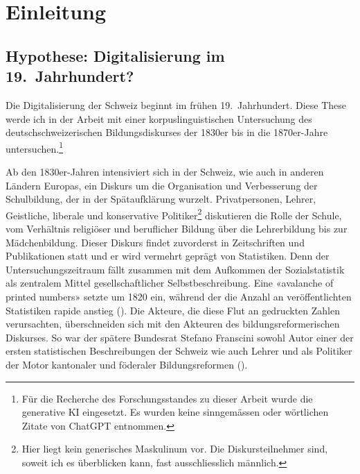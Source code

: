 



\chapter{Einleitung} %

\label{Chapter1} %



\section{Hypothese: Digitalisierung im 19.~Jahrhundert?}
Die Digitalisierung der Schweiz beginnt im frühen 19.~Jahrhundert. Diese These werde ich in der Arbeit mit einer korpuslinguistischen Untersuchung des deutschschweizerischen Bildungsdiskurses der 1830er bis in die 1870er-Jahre untersuchen.\footnote{Für die Recherche des Forschungsstandes zu dieser Arbeit wurde die generative KI  eingesetzt. Es wurden keine sinngemässen oder wörtlichen Zitate von ChatGPT entnommen.}

Ab den 1830er-Jahren intensiviert sich in der Schweiz, wie auch in anderen Ländern Europas, ein Diskurs um die Organisation und Verbesserung der Schulbildung, der in der Spätaufklärung wurzelt. Privatpersonen, Lehrer, Geistliche, liberale und konservative Politiker\footnote{Hier liegt kein generisches Maskulinum vor. Die Diskursteilnehmer sind, soweit ich es überblicken kann, fast ausschliesslich männlich.} diskutieren die Rolle der Schule, vom Verhältnis religiöser und beruflicher Bildung über die Lehrerbildung bis zur Mädchenbildung. Dieser Diskurs findet zuvorderst in Zeitschriften und Publikationen statt und er wird vermehrt geprägt von Statistiken. Denn der Untersuchungszeitraum fällt zusammen mit dem Aufkommen der Sozialstatistik als zentralem Mittel gesellschaftlicher Selbstbeschreibung. Eine «avalanche of printed numbers» setzte um 1820 ein, während der die Anzahl an veröffentlichten Statistiken rapide anstieg (\cite{hacking_biopower_1982}). Die Akteure, die diese Flut an gedruckten Zahlen verursachten, überschneiden sich mit den Akteuren des bildungsreformerischen Diskurses. So war der spätere Bundesrat Stefano Franscini sowohl Autor einer der ersten statistischen Beschreibungen der Schweiz wie auch Lehrer und als Politiker der Motor kantonaler und föderaler Bildungsreformen (\cite{marcacci_franscini_2022}). 

